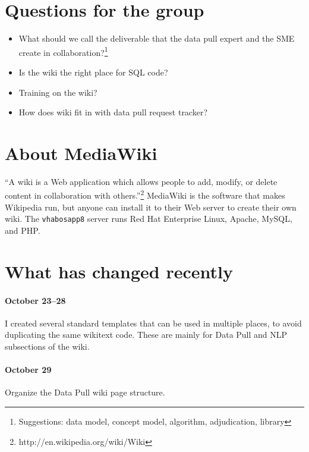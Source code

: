\documentclass{tufte-handout}
\begin{document}
\section{Questions for the group}

\begin{itemize}

\item What should we call the deliverable that the data pull expert
  and the SME create in collaboration?\footnote{Suggestions: data
    model, concept model, algorithm, adjudication, library}

\item Is the wiki the right place for SQL code?

\item Training on the wiki?

\item How does wiki fit in with data pull request tracker?

\end{itemize}


\section{About MediaWiki}

``A wiki is a Web application which allows people to add, modify, or
delete content in collaboration with
others.''\footnote{http://en.wikipedia.org/wiki/Wiki} MediaWiki is the
software that makes Wikipedia run, but anyone can install it to their
Web server to create their own wiki. The \texttt{vhabosapp8} server
runs Red Hat Enterprise Linux, Apache, MySQL, and PHP.

\section{What has changed recently}

\paragraph{October 23--28} I created several standard templates that
can be used in multiple places, to avoid duplicating the same wikitext
code. These are mainly for Data Pull and NLP subsections of the wiki. 

\paragraph{October 29} Organize the Data Pull wiki page structure. 
\end{document}
